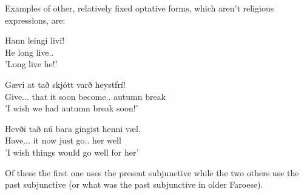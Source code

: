 \documentclass[12pt,%
    times,
]{lin-v2/lin}
\begin{document}
Examples of other, relatively fixed optative forms, which aren't religious expressions, are:
\begin{exe}
    \ex
    \begin{xlist}
        \item \gll Hann leingi livi!\\
        He long live.\Third\Sg.\Subj{}\\
        \trans 'Long live he!'
        \item \gll Gævi at tað skjótt varð heystfrí!\\
        Give.\Third\Sg.\Pst.\Subj{} that it soon become.\Sg.\Pst{} {autumn break}\\
        \trans 'I wish we had autumn break soon!'
        \item \gll Hevði tað nú bara gingist henni væl.\\
        Have.\Third\Sg.\Pst.\Subj{} it now just go.\Sg.\Pst{} her well\\
        \trans 'I wish things would go well for her'
    \end{xlist}
\end{exe}

Of these the first one uses the present subjunctive while the two others use the past subjunctive (or what was the
past subjunctive in older Faroese).
\end{document}
